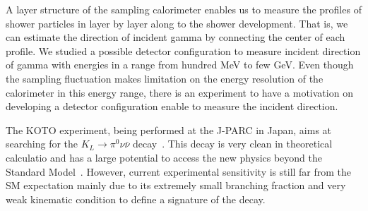 \documentclass[jkps,preprint,fleqn,showpacs,showkeys]{revtex4}
\begin{document}
A layer structure of the sampling calorimeter enables us to measure the profiles of shower particles in layer by layer along to the shower development. That is, we can estimate the direction of incident gamma by connecting the center of each profile. We studied a possible detector configuration to measure incident direction of gamma with energies in a range from hundred MeV to few GeV. 
Even though the sampling fluctuation makes limitation on the energy resolution of the calorimeter in this energy range, there is an experiment to have a motivation on developing a detector configuration enable to measure the incident direction.

The KOTO experiment, being performed at the J-PARC in Japan, aims at searching for the $K_L \rightarrow \pi^0 \nu \bar{\nu}$ decay~\cite{KOTOproposal}.  This decay is very clean in theoretical calculatio and has a large potential to access the new physics beyond the Standard Model~\cite{NewPhys}. However, current experimental sensitivity is still far from the SM expectation mainly due to its extremely small branching fraction and very weak kinematic condition to define a signature of the decay\cite{KOTO}. 
\end{document}
